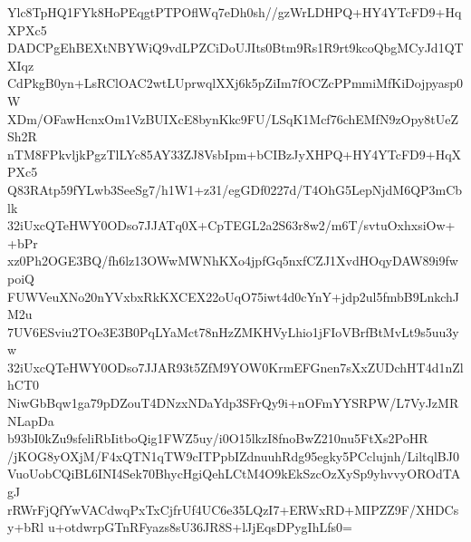Ylc8TpHQ1FYk8HoPEqgtPTPOflWq7eDh0sh//gzWrLDHPQ+HY4YTcFD9+HqXPXc5
DADCPgEhBEXtNBYWiQ9vdLPZCiDoUJIts0Btm9Rs1R9rt9kcoQbgMCyJd1QTXIqz
CdPkgB0yn+LsRClOAC2wtLUprwqlXXj6k5pZiIm7fOCZcPPmmiMfKiDojpyasp0W
XDm/OFawHcnxOm1VzBUIXcE8bynKkc9FU/LSqK1Mcf76chEMfN9zOpy8tUeZSh2R
nTM8FPkvljkPgzTlLYc85AY33ZJ8VsbIpm+bCIBzJyXHPQ+HY4YTcFD9+HqXPXc5
Q83RAtp59fYLwb3SeeSg7/h1W1+z31/egGDf0227d/T4OhG5LepNjdM6QP3mCblk
32iUxcQTeHWY0ODso7JJATq0X+CpTEGL2a2S63r8w2/m6T/svtuOxhxsiOw++bPr
xz0Ph2OGE3BQ/fh6lz13OWwMWNhKXo4jpfGq5nxfCZJ1XvdHOqyDAW89i9fwpoiQ
FUWVeuXNo20nYVxbxRkKXCEX22oUqO75iwt4d0cYnY+jdp2ul5fmbB9LnkchJM2u
7UV6ESviu2TOe3E3B0PqLYaMct78nHzZMKHVyLhio1jFIoVBrfBtMvLt9s5uu3yw
32iUxcQTeHWY0ODso7JJAR93t5ZfM9YOW0KrmEFGnen7sXxZUDchHT4d1nZlhCT0
NiwGbBqw1ga79pDZouT4DNzxNDaYdp3SFrQy9i+nOFmYYSRPW/L7VyJzMRNLapDa
b93bI0kZu9sfeliRbIitboQig1FWZ5uy/i0O15lkzI8fnoBwZ210nu5FtXs2PoHR
/jKOG8yOXjM/F4xQTN1qTW9cITPpbIZdnuuhRdg95egky5PCclujnh/LiltqlBJ0
VuoUobCQiBL6INI4Sek70BhycHgiQehLCtM4O9kEkSzcOzXySp9yhvvyOROdTAgJ
rRWrFjQfYwVACdwqPxTxCjfrUf4UC6e35LQzI7+ERWxRD+MIPZZ9F/XHDCsy+bRl
u+otdwrpGTnRFyazs8sU36JR8S+lJjEqsDPygIhLfs0=
